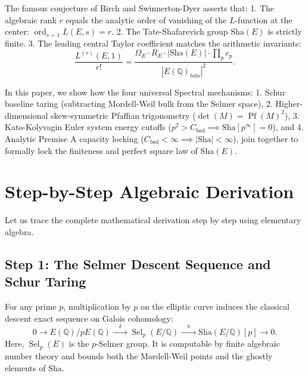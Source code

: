 \documentclass[11pt,a4paper]{article}
\providecommand{\Sha}{\mathrm{Sha}}
\theoremstyle{definition}
\begin{document}
The famous conjecture of Birch and Swinnerton-Dyer asserts that:
1. The algebraic rank $r$ equals the analytic order of vanishing of the $L$-function at the center: $\operatorname{ord}_{s=1} L(E, s) = r$.
2. The Tate-Shafarevich group $\Sha(E)$ is strictly finite.
3. The leading central Taylor coefficient matches the arithmetic invariants:
\begin{equation}
\frac{L^{(r)}(E, 1)}{r!} = \frac{\Omega_E \cdot R_E \cdot |\Sha(E)| \cdot \prod_p c_p}{|E(\mathbb{Q})_{\mathrm{tors}}|^2}.
\end{equation}

In this paper, we show how the four universal Spectral mechanisms:
1. Schur baseline taring (subtracting Mordell-Weil bulk from the Selmer space),
2. Higher-dimensional skew-symmetric Pfaffian trigonometry ($\det(M) = \operatorname{Pf}(M)^2$),
3. Kato-Kolyvagin Euler system energy cutoffs ($p^2 > C_{\mathrm{bsd}} \implies \Sha[p^\infty] = 0$), and
4. Analytic Premise A capacity locking ($C_{\mathrm{bsd}} < \infty \implies |\Sha| < \infty$),
join together to formally lock the finiteness and perfect square law of $\Sha(E)$.


\section{Step-by-Step Algebraic Derivation}

Let us trace the complete mathematical derivation step by step using elementary algebra.

\subsection{Step 1: The Selmer Descent Sequence and Schur Taring}
For any prime $p$, multiplication by $p$ on the elliptic curve induces the classical descent exact sequence on Galois cohomology:
\begin{equation}
0 \longrightarrow E(\mathbb{Q})/p E(\mathbb{Q}) \xrightarrow{\quad\delta\quad} \operatorname{Sel}_p(E/\mathbb{Q}) \xrightarrow{\quad\pi\quad} \Sha(E/\mathbb{Q})[p] \longrightarrow 0.
\end{equation}
Here, $\operatorname{Sel}_p(E)$ is the $p$-Selmer group. It is computable by finite algebraic number theory and bounds both the Mordell-Weil points and the ghostly elements of $\Sha$.
\end{document}
